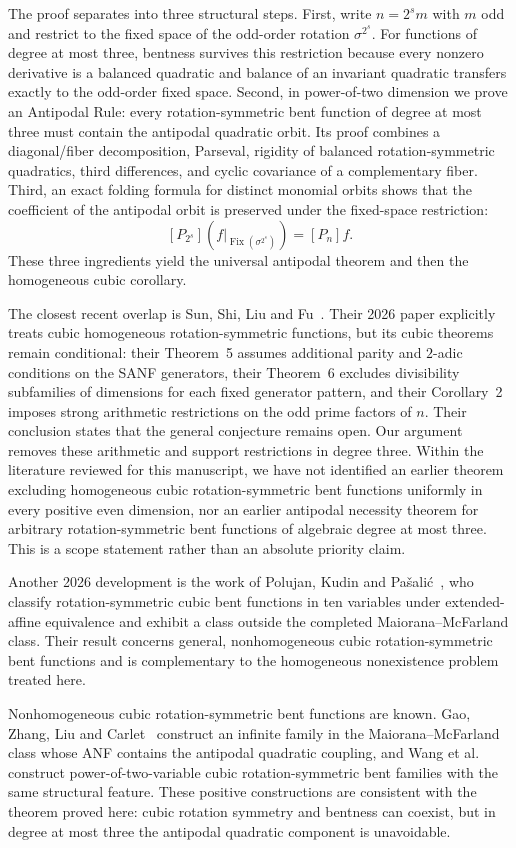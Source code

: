 \documentclass[11pt,a4paper]{article}
\newcommand{\Fix}{\operatorname{Fix}}
\begin{document}
The proof separates into three structural steps. First, write $n=2^s m$ with $m$ odd and restrict to the fixed space of the odd-order rotation $\sigma^{2^s}$. For functions of degree at most three, bentness survives this restriction because every nonzero derivative is a balanced quadratic and balance of an invariant quadratic transfers exactly to the odd-order fixed space. Second, in power-of-two dimension we prove an Antipodal Rule: every rotation-symmetric bent function of degree at most three must contain the antipodal quadratic orbit. Its proof combines a diagonal/fiber decomposition, Parseval, rigidity of balanced rotation-symmetric quadratics, third differences, and cyclic covariance of a complementary fiber. Third, an exact folding formula for distinct monomial orbits shows that the coefficient of the antipodal orbit is preserved under the fixed-space restriction:
\[
[P_{2^s}](f|_{\Fix(\sigma^{2^s})})=[P_n]f.
\]
These three ingredients yield the universal antipodal theorem and then the homogeneous cubic corollary.

The closest recent overlap is Sun, Shi, Liu and Fu~\cite{sun}. Their 2026 paper explicitly treats cubic homogeneous rotation-symmetric functions, but its cubic theorems remain conditional: their Theorem~5 assumes additional parity and $2$-adic conditions on the SANF generators, their Theorem~6 excludes divisibility subfamilies of dimensions for each fixed generator pattern, and their Corollary~2 imposes strong arithmetic restrictions on the odd prime factors of $n$. Their conclusion states that the general conjecture remains open. Our argument removes these arithmetic and support restrictions in degree three. Within the literature reviewed for this manuscript, we have not identified an earlier theorem excluding homogeneous cubic rotation-symmetric bent functions uniformly in every positive even dimension, nor an earlier antipodal necessity theorem for arbitrary rotation-symmetric bent functions of algebraic degree at most three. This is a scope statement rather than an absolute priority claim.

Another 2026 development is the work of Polujan, Kudin and Pa\v{s}ali\'c~\cite{polujan2026}, who classify rotation-symmetric cubic bent functions in ten variables under extended-affine equivalence and exhibit a class outside the completed Maiorana--McFarland class. Their result concerns general, nonhomogeneous cubic rotation-symmetric bent functions and is complementary to the homogeneous nonexistence problem treated here.

Nonhomogeneous cubic rotation-symmetric bent functions are known. Gao, Zhang, Liu and Carlet~\cite{gao2012} construct an infinite family in the Maiorana--McFarland class whose ANF contains the antipodal quadratic coupling, and Wang et al.~\cite{wang2015} construct power-of-two-variable cubic rotation-symmetric bent families with the same structural feature. These positive constructions are consistent with the theorem proved here: cubic rotation symmetry and bentness can coexist, but in degree at most three the antipodal quadratic component is unavoidable.
\end{document}
